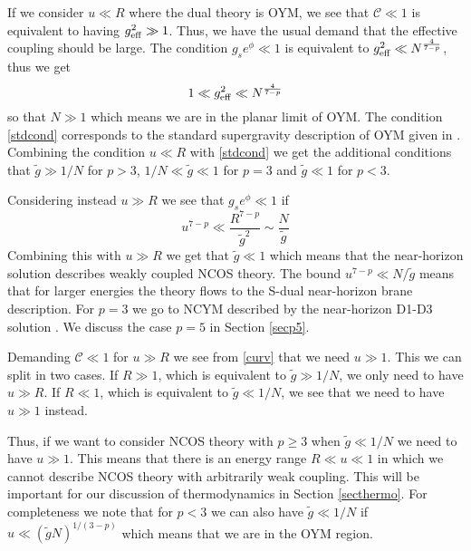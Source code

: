 \documentclass[a4paper,twoside,titlepage,12pt]{article}
\begin{document}
If we consider \( u \ll R \) where the dual theory is OYM, we see that
\( \mathcal{C} \ll 1 \) is equivalent to having \( g_{\mathrm{eff}}^2 \gg 1 \).
Thus, we have the usual demand that the effective coupling should
be large. 
The condition \( g_s e^\phi \ll 1 \) is equivalent to
\( g_{\mathrm{eff}}^2 \ll N^{\frac{4}{7-p}} \), thus we get
%
\begin{equation}
\label{stdcond}
1 \ll g_{\mathrm{eff}}^2 \ll N^{\frac{4}{7-p}}
\end{equation}
%
so that \( N \gg 1 \)
which means we are in the planar limit of OYM. The condition
\eqref{stdcond} corresponds to 
the standard supergravity description of OYM 
given in \cite{Maldacena:1997re,Itzhaki:1998dd}.
Combining the condition \( u \ll R \) with \eqref{stdcond}
we get the additional conditions
that \( \tilde{g} \gg 1/N \) for \( p > 3 \), 
\( 1/N \ll \tilde{g} \ll 1 \) for \( p=3 \) and
\( \tilde{g} \ll 1 \) for \( p < 3 \).


Considering instead \( u \gg R \) we see that \( g_s e^{\phi} \ll 1 \) if
%
\begin{equation}
\label{dilsmall}
u^{7-p} \ll \frac{R^{7-p}}{\tilde{g}^2} \sim \frac{N}{\tilde{g}}
\end{equation}
%
Combining this with \( u \gg R \) we get that \( \tilde{g} \ll 1 \) 
which means that the near-horizon solution describes
weakly coupled NCOS theory. 
The bound \( u^{7-p} \ll N/\tilde{g} \) means that for larger energies
the theory flows to the S-dual near-horizon brane description.
For $p=3$ we go to NCYM described by the near-horizon
D1-D3 solution \cite{Ganor:2000my,Gopakumar:2000na}.
We discuss the case $p=5$ in Section \ref{secp5}. 

Demanding \( \mathcal{C} \ll 1 \) for \( u \gg R \)
we see from \eqref{curv} that we need \( u \gg 1 \).
This we can split in two cases.
If \( R \gg 1 \), which is equivalent to \( \tilde{g} \gg 1/N \),
we only need to have \( u \gg R \).
If \( R \ll 1 \), which is equivalent to \( \tilde{g} \ll 1/N \),
we see that we need to have \( u \gg 1 \) instead.

Thus, if we want to consider NCOS theory with $p \geq 3$ when \( \tilde{g} \ll 1/N \)
we need to have \( u \gg 1 \). 
This means that there is an energy range \( R \ll u \ll 1 \)
in which we cannot describe NCOS theory with arbitrarily weak coupling.
This will be important for our discussion of thermodynamics in 
Section \ref{secthermo}.
For completeness we note that for $p<3$ we can also have
$\tilde{g} \ll 1/N$ if $u \ll (\tilde{g} N)^{1/(3-p)}$
which means that we are in the OYM region.
\end{document}
